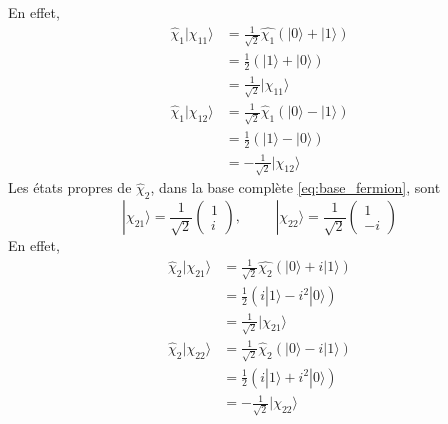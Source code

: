 \documentclass{article}
\numberwithin{equation}{section}
\theoremstyle{solution}
\begin{document}
En effet, 
\begin{align*}
        \hat{\chi}_1 | \chi_{11} \rangle &= \frac{1}{\sqrt{2}} \hat{\chi_1}(| 0 \rangle + | 1 \rangle ) \\
                        &= \frac{1}{2} (| 1 \rangle + | 0 \rangle ) \\
                        &= \frac{1}{\sqrt{2}}| \chi_{11} \rangle \\
        \hat{\chi}_1 | \chi_{12} \rangle &= \frac{1}{\sqrt{2}}\hat{\chi}_1 (| 0 \rangle - | 1 \rangle ) \\
                &= \frac{1}{2}(| 1 \rangle - | 0 \rangle  ) \\
                &= -\frac{1}{\sqrt{2}}| \chi_{12} \rangle 
\end{align*} 
Les états propres de $\hat{\chi}_2$, dans la base complète \eqref{eq:base_fermion}, sont
\begin{equation}
        \boxed{| \chi_{21} \rangle = \frac{1}{\sqrt{2}} \begin{pmatrix}
                1 \\ i
        \end{pmatrix}
        ,
        \hspace{1cm}
        | \chi_{22} \rangle = \frac{1}{\sqrt{2}}\begin{pmatrix}
                1 \\ -i
        \end{pmatrix}
}
\end{equation} 
En effet, 
\begin{align*}
        \hat{\chi}_2 | \chi_{21} \rangle &= \frac{1}{\sqrt{2}} \hat{\chi_2}(| 0 \rangle + i| 1 \rangle ) \\
                        &= \frac{1}{2} (i| 1 \rangle - i^2| 0 \rangle ) \\
                        &= \frac{1}{\sqrt{2}}| \chi_{21} \rangle \\
        \hat{\chi}_2 | \chi_{22} \rangle &= \frac{1}{\sqrt{2}}\hat{\chi}_2 (| 0 \rangle - i| 1 \rangle ) \\
                &= \frac{1}{2}(i| 1 \rangle + i^2| 0 \rangle  ) \\
                &= -\frac{1}{\sqrt{2}}| \chi_{22} \rangle 
\end{align*} 
\end{document}
